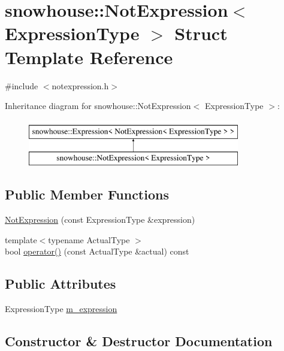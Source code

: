 \hypertarget{structsnowhouse_1_1NotExpression}{}\section{snowhouse\+::Not\+Expression$<$ Expression\+Type $>$ Struct Template Reference}
\label{structsnowhouse_1_1NotExpression}


{\ttfamily \#include $<$notexpression.\+h$>$}

Inheritance diagram for snowhouse\+::Not\+Expression$<$ Expression\+Type $>$\+:\begin{figure}[H]
\begin{center}
\leavevmode
\includegraphics[height=2.000000cm]{structsnowhouse_1_1NotExpression}
\end{center}
\end{figure}
\subsection*{Public Member Functions}
\begin{DoxyCompactItemize}
\item 
\mbox{\hyperlink{structsnowhouse_1_1NotExpression_a3bac169049e234da1a2c28e231d02555}{Not\+Expression}} (const Expression\+Type \&expression)
\item 
{\footnotesize template$<$typename Actual\+Type $>$ }\\bool \mbox{\hyperlink{structsnowhouse_1_1NotExpression_ae7eff61f740ff505a2e656f6422944d2}{operator()}} (const Actual\+Type \&actual) const
\end{DoxyCompactItemize}
\subsection*{Public Attributes}
\begin{DoxyCompactItemize}
\item 
Expression\+Type \mbox{\hyperlink{structsnowhouse_1_1NotExpression_a1d271febb24f6898dff2ea7950342238}{m\+\_\+expression}}
\end{DoxyCompactItemize}


\subsection{Constructor \& Destructor Documentation}
\mbox{\label{structsnowhouse_1_1NotExpression_a3bac169049e234da1a2c28e231d02555}} 
